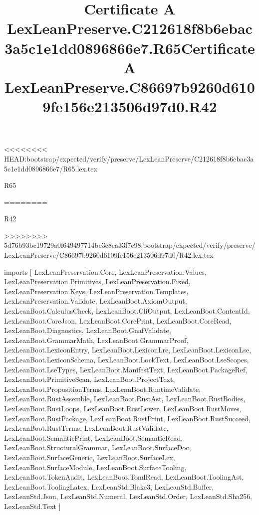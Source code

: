 <<<<<<<< HEAD:bootstrap/expected/verify/preserve/LexLeanPreserve/C212618f8b6ebac3a5c1e1dd0896866e7/R65.lex.tex
\begin{lexlean}{R65}
\title{Certificate A LexLeanPreserve.C212618f8b6ebac3a5c1e1dd0896866e7.R65}
========
\begin{lexlean}{R42}
\title{Certificate A LexLeanPreserve.C86697b9260d6109fe156e213506d97d0.R42}
>>>>>>>> 5d76b93bc19729a0f649497714bc3c8ea33f7c98:bootstrap/expected/verify/preserve/LexLeanPreserve/C86697b9260d6109fe156e213506d97d0/R42.lex.tex
\begin{coremodule}
imports [
  LexLeanPreservation.Core,
  LexLeanPreservation.Values,
  LexLeanPreservation.Primitives,
  LexLeanPreservation.Fixed,
  LexLeanPreservation.Keys,
  LexLeanPreservation.Templates,
  LexLeanPreservation.Validate,
  LexLeanBoot.AxiomOutput,
  LexLeanBoot.CalculusCheck,
  LexLeanBoot.CliOutput,
  LexLeanBoot.ContentId,
  LexLeanBoot.CoreJson,
  LexLeanBoot.CorePrint,
  LexLeanBoot.CoreRead,
  LexLeanBoot.Diagnostics,
  LexLeanBoot.GnafValidate,
  LexLeanBoot.GrammarMath,
  LexLeanBoot.GrammarProof,
  LexLeanBoot.LexiconEntry,
  LexLeanBoot.LexiconLre,
  LexLeanBoot.LexiconLse,
  LexLeanBoot.LexiconSchema,
  LexLeanBoot.LockText,
  LexLeanBoot.LseScopes,
  LexLeanBoot.LseTypes,
  LexLeanBoot.ManifestText,
  LexLeanBoot.PackageRef,
  LexLeanBoot.PrimitiveScan,
  LexLeanBoot.ProjectText,
  LexLeanBoot.PropositionTerms,
  LexLeanBoot.RuntimeValidate,
  LexLeanBoot.RustAssemble,
  LexLeanBoot.RustAst,
  LexLeanBoot.RustBodies,
  LexLeanBoot.RustLoops,
  LexLeanBoot.RustLower,
  LexLeanBoot.RustMoves,
  LexLeanBoot.RustPackage,
  LexLeanBoot.RustPrint,
  LexLeanBoot.RustSucceed,
  LexLeanBoot.RustTerms,
  LexLeanBoot.RustValidate,
  LexLeanBoot.SemanticPrint,
  LexLeanBoot.SemanticRead,
  LexLeanBoot.StructuralGrammar,
  LexLeanBoot.SurfaceDoc,
  LexLeanBoot.SurfaceGeneric,
  LexLeanBoot.SurfaceLex,
  LexLeanBoot.SurfaceModule,
  LexLeanBoot.SurfaceTooling,
  LexLeanBoot.TokenAudit,
  LexLeanBoot.TomlRead,
  LexLeanBoot.ToolingAst,
  LexLeanBoot.ToolingLatex,
  LexLeanStd.Blake3,
  LexLeanStd.Buffer,
  LexLeanStd.Json,
  LexLeanStd.Numeral,
  LexLeanStd.Order,
  LexLeanStd.Sha256,
  LexLeanStd.Text
]


\end{coremodule}
\end{lexlean}
\end{lexlean}
